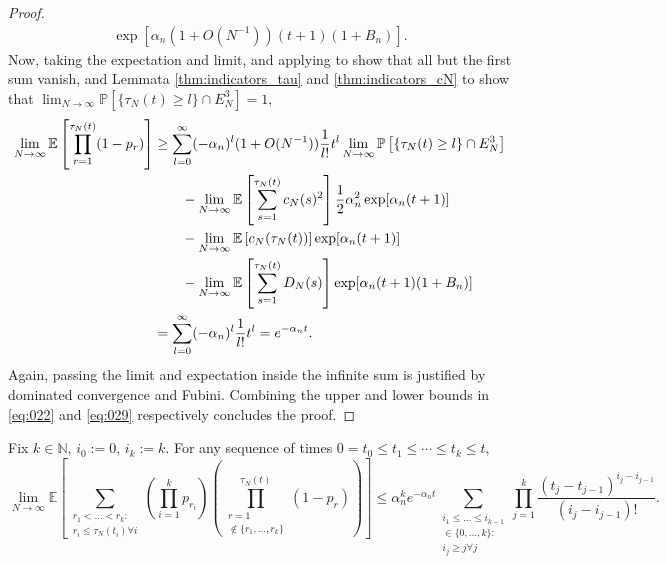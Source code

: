 \documentclass{article}
\newcommand{\Prob}{\mathbb{P}}
\newcommand{\E}{\mathbb{E}}
\newcommand{\1}[1]{\mathbbm{1}_{#1}}
\begin{document}
\begin{proof}
\begin{align}
        \exp[ \alpha_n (1+O(N^{-1})) (t+1) (1+B_n) ]. \label{eq:028}
\end{align}
Now, taking the expectation and limit, and applying \citet[Equations (3.3)--(3.5)]{brown2021} to show that all but the first sum vanish, and Lemmata \ref{thm:indicators_tau} and \ref{thm:indicators_cN} to show that $\lim_{N\to\infty} \Prob[ \{\tau_N(t) \geq l\} \cap E_N^3 ] =1$,
\begin{align}
\lim_{N\to\infty} \E \left[ \prod_{r=1}^{\tau_N(t)} (1-p_r) \right]
&\geq \sum_{l=0}^{\infty} (-\alpha_n)^l (1+O(N^{-1})) \frac{1}{l!} t^l 
        \lim_{N\to\infty} \Prob\left[ \{\tau_N(t) \geq l\} \cap E_N^3 \right] \notag\\
    &\qquad- \lim_{N\to\infty} \E \left[ \sum_{s=1}^{\tau_N(t)} c_N(s)^2 \right]
        \frac{1}{2} \alpha_n^2 \exp[ \alpha_n (t+1) ]\notag\\
    &\qquad- \lim_{N\to\infty} \E \left[ c_N(\tau_N(t)) \right] 
        \exp[ \alpha_n (t+1) ] \notag\\
    &\qquad- \lim_{N\to\infty} \E \left[ \sum_{s=1}^{\tau_N(t)} D_N(s) \right]
        \exp[ \alpha_n (t+1) (1+B_n) ] \notag\\
&= \sum_{l=0}^{\infty} (-\alpha_n)^l \frac{1}{l!} t^l
= e^{-\alpha_n t}. \label{eq:029}
\end{align}
Again, passing the limit and expectation inside the infinite sum is justified by dominated convergence and Fubini.
Combining the upper and lower bounds in \eqref{eq:022} and \eqref{eq:029} respectively concludes the proof.
\end{proof}


\begin{lemma}\label{thm:inductionUB}
Fix $k \in \mathbb{N}$, $i_0:=0$, $i_k:=k$. For any sequence of times
$0 = t_0 \leq t_1 \leq \cdots \leq t_k \leq t$,
\begin{equation}\label{eq:030}
\lim_{N\to\infty} \E \left[ 
        \sum_{\substack{r_1 <\dots< r_k :\\ r_i \leq \tau_N(t_i) \forall i}}
        \left( \prod_{i=1}^k p_{r_i} \right)
        \left( \prod_{\substack{r=1 \\ \notin \{r_1,\dots,r_k\} }}^{\tau_N(t)} 
        (1-p_r) \right) \right]
\leq \alpha_n^k e^{-\alpha_n t}
        \sum_{\substack{i_1\leq \dots\leq i_{k-1}\\ \in \{0,\dots,k\} :
        \\ i_j \geq j \forall j}} 
        \prod_{j=1}^k \frac{(t_j - t_{j-1})^{i_j - i_{j-1}}}{(i_j - i_{j-1})! } .
\end{equation}
\end{lemma}
\end{document}

